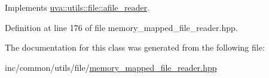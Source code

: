 Implements \hyperlink{classuva_1_1utils_1_1file_1_1afile__reader_a767f8631cf08f1bbbb381585a55ce3a1}{uva\+::utils\+::file\+::afile\+\_\+reader}.



Definition at line 176 of file memory\+\_\+mapped\+\_\+file\+\_\+reader.\+hpp.



The documentation for this class was generated from the following file\+:\begin{DoxyCompactItemize}
\item 
inc/common/utils/file/\hyperlink{memory__mapped__file__reader_8hpp}{memory\+\_\+mapped\+\_\+file\+\_\+reader.\+hpp}\end{DoxyCompactItemize}
